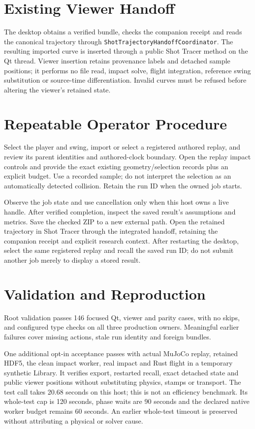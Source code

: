 \documentclass[11pt]{article}
\newcommand{\code}[1]{\nolinkurl{#1}}
\begin{document}
\section*{Existing Viewer Handoff}
The desktop obtains a verified bundle, checks the companion receipt and reads
the canonical trajectory through \code{ShotTrajectoryHandoffCoordinator}.
The resulting imported curve is inserted through a public Shot Tracer method on
the Qt thread. Viewer insertion retains provenance labels and detached sample
positions; it performs no file read, impact solve, flight integration, reference
swing substitution or source-time differentiation. Invalid curves must be
refused before altering the viewer's retained state.

\newpage
\section*{Repeatable Operator Procedure}
Select the player and swing, import or select a registered authored replay, and
review its parent identities and authored-clock boundary. Open the replay impact
controls and provide the exact existing geometry/selection records plus an
explicit budget. Use a recorded sample; do not interpret the selection as an
automatically detected collision. Retain the run ID when the owned job starts.

Observe the job state and use cancellation only when this host owns a live
handle. After verified completion, inspect the saved result's assumptions and
metrics. Save the checked ZIP to a new external path. Open the retained trajectory
in Shot Tracer through the integrated handoff, retaining the companion receipt
and explicit research context. After restarting the desktop, select the same
registered replay and recall the saved run ID; do not submit another job merely
to display a stored result.

\section*{Validation and Reproduction}
Root validation passes 146 focused Qt, viewer and parity cases, with no skips,
and configured type checks on all three production owners. Meaningful earlier
failures cover missing actions, stale run identity and foreign bundles.

One additional opt-in acceptance passes with actual MuJoCo replay, retained HDF5,
the clean impact worker, real impact and Rust flight in a temporary synthetic
Library. It verifies export, restarted recall, exact detached state and public
viewer positions without substituting physics, stamps or transport. The test
call takes 20.68 seconds on this host; this is not an efficiency benchmark.
Its whole-test cap is 120 seconds, phase waits are 90 seconds and the declared
native worker budget remains 60 seconds. An earlier whole-test timeout is
preserved without attributing a physical or solver cause.
\end{document}
